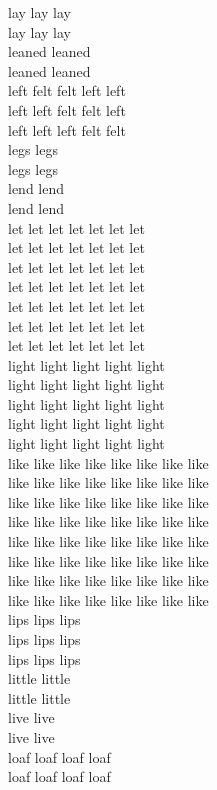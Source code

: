 lay lay lay\\
lay lay lay\\
leaned leaned\\
leaned leaned\\
left felt felt left left\\
left left felt felt left\\
left left left felt felt\\
legs legs\\
legs legs\\
lend lend\\
lend lend\\
let let let let let let let\\
let let let let let let let\\
let let let let let let let\\
let let let let let let let\\
let let let let let let let\\
let let let let let let let\\
let let let let let let let\\
light light light light light\\
light light light light light\\
light light light light light\\
light light light light light\\
light light light light light\\
like like like like like like like like\\
like like like like like like like like\\
like like like like like like like like\\
like like like like like like like like\\
like like like like like like like like\\
like like like like like like like like\\
like like like like like like like like\\
like like like like like like like like\\
lips lips lips\\
lips lips lips\\
lips lips lips\\
little little\\
little little\\
live live\\
live live\\
loaf loaf loaf loaf\\
loaf loaf loaf loaf\\
